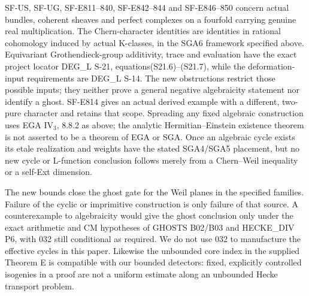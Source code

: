 SF-US, SF-UG, SF-E811--840, SF-E842--844 and SF-E846--850
concern actual bundles, coherent sheaves and perfect complexes on a
fourfold carrying genuine real multiplication. The Chern-character
identities are identities in rational cohomology induced by actual
K-classes, in the SGA6 framework specified above. Equivariant
Grothendieck-group additivity, trace and evaluation have the exact
project locator DEG\_L S-21, equations(S21.6)--(S21.7), while the
deformation-input requirements are DEG\_L S-14. The new obstructions
restrict those possible inputs; they neither prove a general negative
algebraicity statement nor identify a ghost. SF-E814 gives an actual
derived example with a different, two-pure character and retains that
scope. Spreading any fixed algebraic construction uses EGA IV$_3$,
8.8.2 as above; the analytic Hermitian--Einstein existence theorem is
not asserted to be a theorem of EGA or SGA. Once an algebraic cycle
exists its etale realization and weights have the stated SGA4/SGA5
placement, but no new cycle or L-function conclusion follows merely
from a Chern--Weil inequality or a self-Ext dimension.

The new bounds close the ghost gate for the Weil planes in the
specified families. Failure of the cyclic or imprimitive construction
is only failure of that source. A counterexample to algebraicity
would give the ghost conclusion only under the exact arithmetic and
CM hypotheses of GHOSTS B02/B03 and HECKE\_DIV P6, with 032 still
conditional as required. We do not use 032 to manufacture the
effective cycles in this paper. Likewise the unbounded core index
in the supplied Theorem E is compatible with our bounded detectors:
fixed, explicitly controlled isogenies in a proof are not a uniform
estimate along an unbounded Hecke transport problem.
